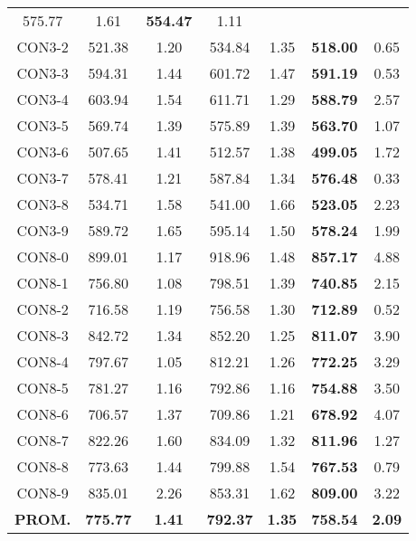 \begin{table}[ht]
\begin{tabular}{c c c c c c c}
575.77 & 1.61 & \bf{554.47} & 
1.11\\CON3-2 & 521.38 & 1.20 & 
534.84 & 1.35 & \bf{518.00} & 
0.65\\CON3-3 & 594.31 & 1.44 & 
601.72 & 1.47 & \bf{591.19} & 
0.53\\CON3-4 & 603.94 & 1.54 & 
611.71 & 1.29 & \bf{588.79} & 
2.57\\CON3-5 & 569.74 & 1.39 & 
575.89 & 1.39 & \bf{563.70} & 
1.07\\CON3-6 & 507.65 & 1.41 & 
512.57 & 1.38 & \bf{499.05} & 
1.72\\CON3-7 & 578.41 & 1.21 & 
587.84 & 1.34 & \bf{576.48} & 
0.33\\CON3-8 & 534.71 & 1.58 & 
541.00 & 1.66 & \bf{523.05} & 
2.23\\CON3-9 & 589.72 & 1.65 & 
595.14 & 1.50 & \bf{578.24} & 
1.99\\CON8-0 & 899.01 & 1.17 & 
918.96 & 1.48 & \bf{857.17} & 
4.88\\CON8-1 & 756.80 & 1.08 & 
798.51 & 1.39 & \bf{740.85} & 
2.15\\CON8-2 & 716.58 & 1.19 & 
756.58 & 1.30 & \bf{712.89} & 
0.52\\CON8-3 & 842.72 & 1.34 & 
852.20 & 1.25 & \bf{811.07} & 
3.90\\CON8-4 & 797.67 & 1.05 & 
812.21 & 1.26 & \bf{772.25} & 
3.29\\CON8-5 & 781.27 & 1.16 & 
792.86 & 1.16 & \bf{754.88} & 
3.50\\CON8-6 & 706.57 & 1.37 & 
709.86 & 1.21 & \bf{678.92} & 
4.07\\CON8-7 & 822.26 & 1.60 & 
834.09 & 1.32 & \bf{811.96} & 
1.27\\CON8-8 & 773.63 & 1.44 & 
799.88 & 1.54 & \bf{767.53} & 
0.79\\CON8-9 & 835.01 & 2.26 & 
853.31 & 1.62 & \bf{809.00} & 
3.22\\\bf{PROM.} & 
\bf{775.77} & \bf{1.41} & \bf{792.37} & \bf{1.35} & \bf{758.54} & \bf{2.09}\\[1ex]\hline
\end{tabular}
\label{table:nonlin}
\end{table} \clearpage
